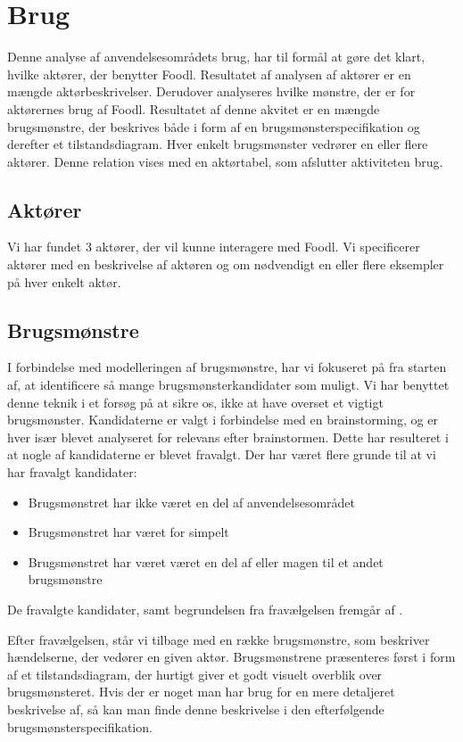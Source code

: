 \section{Brug}
\label{sec:brug}
Denne analyse af anvendelsesområdets brug, har til formål at gøre det klart, hvilke aktører, der benytter Foodl. Resultatet af analysen af aktører er en mængde aktørbeskrivelser. Derudover analyseres hvilke mønstre, der er for aktørernes brug af Foodl. Resultatet af denne akvitet er en mængde brugsmønstre, der beskrives både i form af en brugsmønsterspecifikation og derefter et tilstandsdiagram. Hver enkelt brugsmønster vedrører en eller flere aktører. Denne relation vises med en aktørtabel, som afslutter aktiviteten brug.

\subsection{Aktører}
\label{sec:aktoerer}
Vi har fundet 3 aktører, der vil kunne interagere med Foodl. Vi specificerer aktører med en beskrivelse af aktøren og om nødvendigt en eller flere eksempler på hver enkelt aktør.



\subsection{Brugsmønstre}
\label{subsec:brugsmoenstre}
I forbindelse med modelleringen af brugsmønstre, har vi fokuseret på fra starten af, at identificere så mange brugsmønsterkandidater som muligt. Vi har benyttet denne teknik i et forsøg på at sikre os, ikke at have overset et vigtigt brugsmønster. Kandidaterne er valgt i forbindelse med en brainstorming, og er hver især blevet analyseret for relevans efter brainstormen. Dette har resulteret i at nogle af kandidaterne er blevet fravalgt. Der har været flere grunde til at vi har fravalgt kandidater:
\begin{itemize}
\item Brugsmønstret har ikke været en del af anvendelsesområdet
\item Brugsmønstret har været for simpelt
\item Brugsmønstret har været været en del af eller magen til et andet brugsmønstre
\end{itemize}
De fravalgte kandidater, samt begrundelsen fra fravælgelsen fremgår af .

Efter fravælgelsen, står vi tilbage med en række brugsmønstre, som beskriver hændelserne, der vedører en given aktør. Brugsmønstrene præsenteres først i form af et tilstandsdiagram, der hurtigt giver et godt visuelt overblik over brugsmønsteret. Hvis der er noget man har brug for en mere detaljeret beskrivelse af, så kan man finde denne beskrivelse i den efterfølgende brugsmønsterspecifikation.

